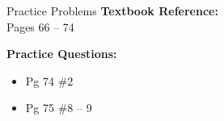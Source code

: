 \documentclass{beamer}
\begin{document}
\begin{frame}{Practice Problems}
\textbf{Textbook Reference:} \\
Pages 66 – 74
 
\vspace{0.4cm}

\textbf{Practice Questions:}
\begin{itemize}
\item Pg 74 \#2
 
\item Pg 75 \#8 – 9
\end{itemize}
\end{frame}
\end{document}
